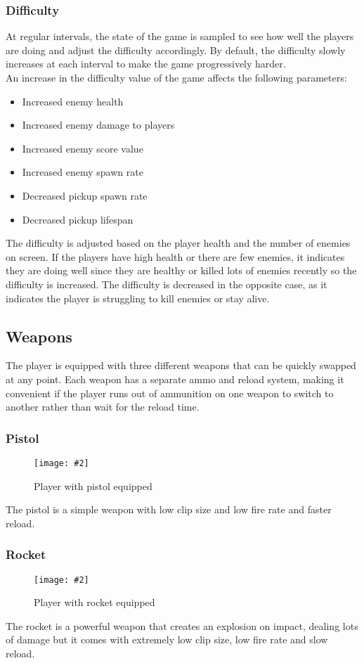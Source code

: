 \documentclass{article}
\newcommand{\n}[0]{\\[\baselineskip]}
\newcommand{\figimg}[3]{
  \begin{figure}[H]
    \centering
    \texttt{[image: \#2]}
    \caption{#3}
  \end{figure}
  \noindent 
}
\begin{document}
\subsubsection{Difficulty}
At regular intervals, the state of the game is sampled to see how well the players are doing and adjust the difficulty accordingly. By default, the difficulty slowly increases at each interval to make the game progressively harder.
\n
An increase in the difficulty value of the game affects the following parameters:
\begin{itemize}
\item Increased enemy health
\item Increased enemy damage to players
\item Increased enemy score value
\item Increased enemy spawn rate
\item Decreased pickup spawn rate
\item Decreased pickup lifespan
\end{itemize}
The difficulty is adjusted based on the player health and the number of enemies on screen. If the players have high health or there are few enemies, it indicates they are doing well since they are healthy or killed lots of enemies recently so the difficulty is increased. The difficulty is decreased in the opposite case, as it indicates the player is struggling to kill enemies or stay alive.

\subsection{Weapons}
The player is equipped with three different weapons that can be quickly swapped at any point. Each weapon has a separate ammo and reload system, making it convenient if the player runs out of ammunition on one weapon to switch to another rather than wait for the reload time.
\subsubsection{Pistol}
\figimg{0.1}{imgs/Gun.png}{Player with pistol equipped}
The pistol is a simple weapon with low clip size and low fire rate and faster reload.

\subsubsection{Rocket}
\figimg{0.1}{imgs/Rocket.png}{Player with rocket equipped}
The rocket is a powerful weapon that creates an explosion on impact, dealing lots of damage but it comes with extremely low clip size, low fire rate and slow reload.
\end{document}
